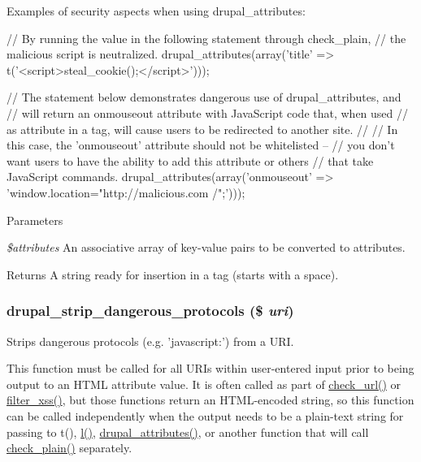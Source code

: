 Examples of security aspects when using drupal\_\-attributes: 
\begin{DoxyCode}
   // By running the value in the following statement through check_plain,
   // the malicious script is neutralized.
   drupal_attributes(array('title' => t('<script>steal_cookie();</script>')));

   // The statement below demonstrates dangerous use of drupal_attributes, and
   // will return an onmouseout attribute with JavaScript code that, when used
   // as attribute in a tag, will cause users to be redirected to another site.
   //
   // In this case, the 'onmouseout' attribute should not be whitelisted --
   // you don't want users to have the ability to add this attribute or others
   // that take JavaScript commands.
   drupal_attributes(array('onmouseout' => 'window.location="http://malicious.com
      /";')));
\end{DoxyCode}



\begin{DoxyParams}{Parameters}
\item[{\em \$attributes}]An associative array of key-\/value pairs to be converted to attributes.\end{DoxyParams}
\begin{DoxyReturn}{Returns}
A string ready for insertion in a tag (starts with a space). 
\end{DoxyReturn}
\hypertarget{group__sanitization_ga46ff2822d576a77317f9045d65317b4f}{
\subsubsection[{drupal\_\-strip\_\-dangerous\_\-protocols}]{\setlength{\rightskip}{0pt plus 5cm}drupal\_\-strip\_\-dangerous\_\-protocols (\$ {\em uri})}}
\label{group__sanitization_ga46ff2822d576a77317f9045d65317b4f}
Strips dangerous protocols (e.g. 'javascript:') from a URI.

This function must be called for all URIs within user-\/entered input prior to being output to an HTML attribute value. It is often called as part of \hyperlink{group__sanitization_gac024315b69035ef05c33674838707919}{check\_\-url()} or \hyperlink{group__sanitization_ga8864a29ffa8de5c9f8dc9e417060660d}{filter\_\-xss()}, but those functions return an HTML-\/encoded string, so this function can be called independently when the output needs to be a plain-\/text string for passing to t(), \hyperlink{common_8inc_ad3b36c06dc46250b8d22b8d0d2e7bd97}{l()}, \hyperlink{group__sanitization_gacf11629fb3d1ebf200863e2d15380b4a}{drupal\_\-attributes()}, or another function that will call \hyperlink{group__sanitization_ga76fc67a30fd8d75ddd80565e6e65a13d}{check\_\-plain()} separately.


